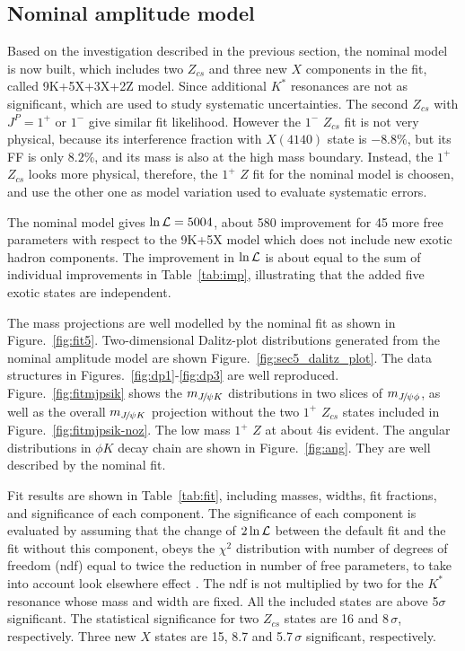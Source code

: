 \subsection{Nominal amplitude model}
\label{subsec:nominal}
Based on the investigation described in the previous section, 
the nominal model is now built, 
which includes two $Z_{cs}$ and three new $X$ components in the fit, 
called 9K+5X+3X+2Z model. 
Since additional $K^*$ resonances are not as significant, 
which are used to study systematic uncertainties. 
The second $Z_{cs}$ with $J^P=1^+$  or $1^-$ give similar fit likelihood. 
However the $1^-$ $Z_{cs}$ fit is not very physical, 
because its interference fraction with $X(4140)$ state is $-8.8\%$, 
but its FF is only $8.2\%$, 
and its mass is also at the high mass boundary. 
Instead, 
the $1^+$ $Z_{cs}$ looks more physical, 
therefore,
the $1^+$ $Z$ fit for the nominal model is choosen, 
and use the other one as model variation used to evaluate systematic errors.

The nominal model gives $\ln\mathcal{L}=5004$, 
about 580 improvement for 45 more free parameters with respect to the 9K+5X model which does not include new exotic hadron components. 
The improvement in $\ln\mathcal{L}$ is about equal to the sum of individual improvements in Table~\ref{tab:imp}, 
illustrating that the added five exotic states are independent.  

The mass projections are well modelled by the nominal fit as shown in Figure.~\ref{fig:fit5}. 
Two-dimensional Dalitz-plot distributions generated from the nominal amplitude model are shown Figure.~\ref{fig:sec5_dalitz_plot}. 
The data structures in Figures.~\ref{fig:dp1}-\ref{fig:dp3} are well reproduced.  
Figure.~\ref{fig:fitmjpsik} shows the $m_{{{J\mskip -3mu/\mskip -2mu\psi}} K}$ distributions in two slices of $m_{{{J\mskip -3mu/\mskip -2mu\psi}} \phi}$, 
as well as  the overall $m_{{{J\mskip -3mu/\mskip -2mu\psi}} K}$ projection without the two $1^+$ $Z_{cs}$ states included in Figure.~\ref{fig:fitmjpsik-noz}. 
The low mass $1^+$ $Z$ at about 4\gev is evident. 
The angular distributions in $\phi K$ decay chain are shown in Figure.~\ref{fig:ang}. 
They are well described by the nominal fit. 

Fit results are shown in Table~\ref{tab:fit}, 
including masses, widths, fit fractions, and significance of each component. 
The significance of each component is evaluated by assuming that the change of $2\ln\mathcal{L}$ between the default fit and the fit without this component, 
obeys the $\chi^2$ distribution with number of degrees of freedom (ndf) equal to twice the reduction in number of free parameters, 
to take into account look elsewhere effect \supercite{LHCb-PAPER-2016-019}. 
The ndf is not multiplied by two for the $K^*$ resonance whose mass and width are fixed. 
All the included states are above 5$\sigma$ significant. 
The statistical significance for two $Z_{cs}$ states are 16 and 8\,$\sigma$, respectively. 
Three new $X$ states are 15, 8.7 and 5.7\,$\sigma$ significant, respectively.


